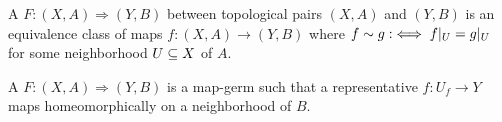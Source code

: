 \begin{mydefinition}
    A  $F: (X, A) \Rightarrow (Y, B)$ between topological pairs $(X, A)$ and $(Y, B)$ is an equivalence class of maps $f: (X, A) \to (Y, B)$
    where $f \sim g :\iff f\vert_{U} = g\vert_{U}$ for some neighborhood $U \subseteq{} X$ of $A$. 
\end{mydefinition}

\begin{myparagraph}
    A  $F: (X, A) \Rightarrow (Y, B)$ is a map-germ
    such that a representative $f: U_f \to Y$ maps homeomorphically on a neighborhood of $B$.  
\end{myparagraph}